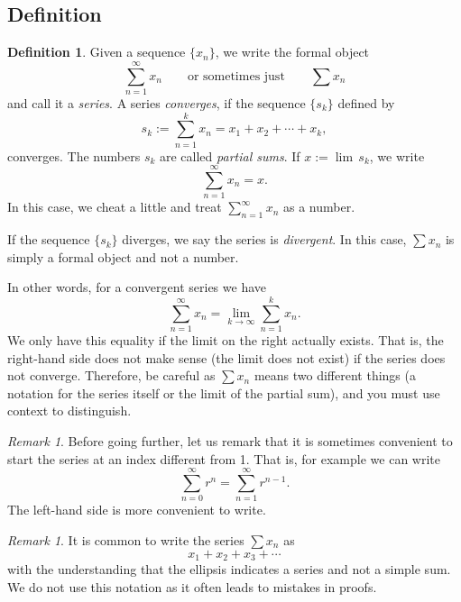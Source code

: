 \documentclass[12pt]{book}
\newcommand{\myindex}[1]{#1\index{#1}}
\theoremstyle{plain}
\theoremstyle{remark}
\newtheorem{remark}[thm]{Remark}
\theoremstyle{definition}
\newtheorem{defn}[thm]{Definition}
\theoremstyle{exercise}
\theoremstyle{example}
\begin{document}
\subsection{Definition}

\begin{defn}
Given a sequence $\{ x_n \}$, we write the formal object
\begin{equation*}
\sum_{n=1}^\infty x_n
\qquad
\text{or sometimes just}
\qquad
\sum x_n
\end{equation*}
and call it a \emph{\myindex{series}}.  A series
\emph{converges}, if the sequence $\{ s_k \}$
defined by
\begin{equation*}
s_k := \sum_{n=1}^k x_n = x_1 + x_2 + \cdots + x_k ,
\end{equation*}
converges.
The numbers $s_k$ are called
\emph{\myindex{partial sums}}.
If $x := \lim\, s_k$, we write
\begin{equation*}
\sum_{n=1}^\infty x_n =  x .
\end{equation*}
In this case, we cheat a little and treat
$\sum_{n=1}^\infty x_n$ as a number.

If the sequence $\{ s_k \}$ diverges,
we say the series is \emph{divergent}.
In this case, $\sum x_n$ is simply a formal object and not a number.
\end{defn}

In other words, for a convergent series we have
\begin{equation*}
\sum_{n=1}^\infty x_n
=
\lim_{k\to\infty} 
\sum_{n=1}^k x_n .
\end{equation*}
We only have this equality if the limit on
the right actually exists.  That is, the right-hand side does not make
sense (the limit does not exist) if the series does not converge.
Therefore, be careful as 
$\sum x_n$ means two different things (a notation for the series itself 
or the limit of the partial sum), and you must use context
to distinguish.

\begin{remark}
Before going further, let us remark that it is sometimes convenient to start
the series at an index different from 1.  That is, for example we can write
\begin{equation*}
\sum_{n=0}^\infty r^n = \sum_{n=1}^\infty r^{n-1} .
\end{equation*}
The left-hand side is more convenient to write.
\end{remark}

\begin{remark}
It is common to write the series $\sum x_n$ as
\begin{equation*}
x_1 + x_2 + x_3 + \cdots
\end{equation*}
with the understanding that the ellipsis indicates a series and
not a simple sum.  We do not use this notation as it often leads to 
mistakes in proofs.
\end{remark}
\end{document}
